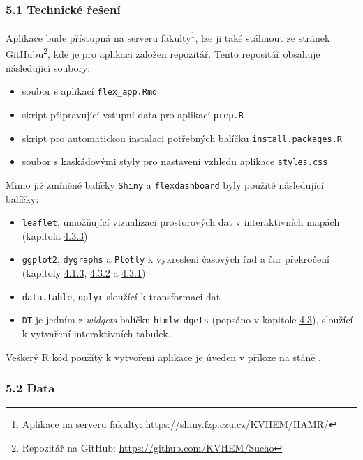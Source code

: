 \documentclass[12pt,]{article}
\providecommand{\tightlist}{%
  \setlength{\itemsep}{0pt}\setlength{\parskip}{0pt}}
\let\rmarkdownfootnote\footnote%
\def\footnote{\protect\rmarkdownfootnote}
\begin{document}
\subsubsection{5.1 Technické řešení}\label{technicke-reseni}

Aplikace bude přístupná na
\href{https://shiny.fzp.czu.cz/KVHEM/HAMR/}{serveru fakulty}\footnote{Aplikace
  na serveru fakulty: \url{https://shiny.fzp.czu.cz/KVHEM/HAMR/}}, lze
ji také \href{https://github.com/KVHEM/Sucho}{stáhnout ze stránek
GitHubu}\footnote{Repozitář na GitHub:
  \url{https://github.com/KVHEM/Sucho}}, kde je pro aplikaci založen
repozitář. Tento repositář obsahuje následující soubory:

\begin{itemize}
\tightlist
\item
  soubor s aplikací \texttt{flex\_app.Rmd}
\item
  skript připravující vstupní data pro aplikací \texttt{prep.R}
\item
  skript pro automatickou instalaci potřebných balíčku
  \texttt{install.packages.R}
\item
  soubor s kaskádovými styly pro nastavení vzhledu aplikace
  \texttt{styles.css}
\end{itemize}

Mimo již zmíněné balíčky \texttt{Shiny} a \texttt{flexdashboard} byly
použité následující balíčky:

\begin{itemize}
\tightlist
\item
  \texttt{leaflet}, umožňující vizualizaci prostorových dat v
  interaktivních mapách (kapitola \protect\hyperlink{leaflet}{4.3.3})
\item
  \texttt{ggplot2}, \texttt{dygraphs} a \texttt{Plotly} k vykreslení
  časových řad a čar překročení (kapitoly
  \protect\hyperlink{ggplot}{4.1.3}, \protect\hyperlink{dygraphs}{4.3.2}
  a \protect\hyperlink{plotly}{4.3.1})
\item
  \texttt{data.table}, \texttt{dplyr} sloužící k transformaci dat
\item
  \texttt{DT} je jedním z \emph{widgets} balíčku \texttt{htmlwidgets}
  (popsáno v kapitole \protect\hyperlink{htmlwidgets}{4.3}), sloužící k
  vytvaření interaktivních tabulek.
\end{itemize}

Veškerý R kód použítý k vytvoření aplikace je úveden v příloze na stáně
\pageref{prilohy}.

\subsubsection{5.2 Data}\label{data}
\end{document}

